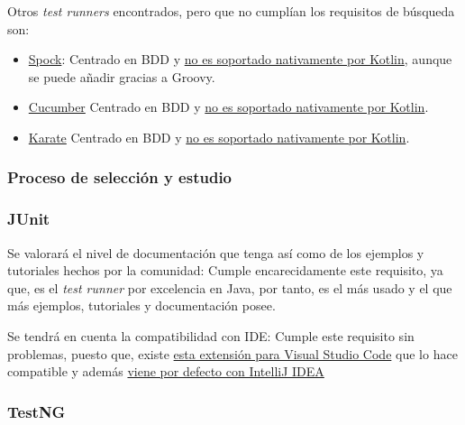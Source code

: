 Otros \emph{test runners} encontrados, pero que no cumplían los requisitos de búsqueda son:
\begin{itemize}
    \item \href{https://spockframework.org/}{Spock}: Centrado en BDD y \href{https://kotlinlang.org/api/latest/kotlin.test/}{no es soportado nativamente por Kotlin}, aunque se puede añadir gracias a Groovy.
    \item \href{https://cucumber.io/}{Cucumber} Centrado en BDD y \href{https://kotlinlang.org/api/latest/kotlin.test/}{no es soportado nativamente por Kotlin}.
    \item \href{https://github.com/karatelabs/karate}{Karate} Centrado en BDD y \href{https://kotlinlang.org/api/latest/kotlin.test/}{no es soportado nativamente por Kotlin}.
\end{itemize}


\subsubsection{Proceso de selección y estudio}

\subsubsection{JUnit}

\begin{todolist}
    \item[\xcmark] Se valorará el nivel de documentación que tenga así como de
    los ejemplos y tutoriales hechos por la comunidad: Cumple encarecidamente
    este requisito, ya que, es el \emph{test runner} por excelencia en Java, por
    tanto, es el más usado y el que más ejemplos, tutoriales y documentación
    posee.
    \item[\xcmark] Se tendrá en cuenta la compatibilidad con IDE: Cumple este
    requisito sin problemas, puesto que, existe
    \href{https://code.visualstudio.com/docs/java/java-testing}{esta extensión para
    Visual Studio Code} que lo hace compatible y además
    \href{https://www.jetbrains.com/help/idea/junit.html}{viene por defecto con
    IntelliJ IDEA}
\end{todolist}


\subsubsection{TestNG}

